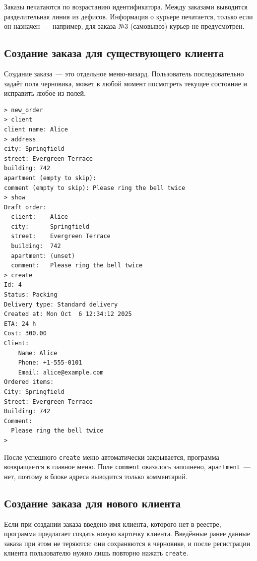 \documentclass[12pt]{extarticle}
\renewcommand{\baselinestretch}{1.5}
\newcommand{\cmd}[1]{\texttt{#1}}
\begin{document}
Заказы печатаются по возрастанию идентификатора. Между
заказами выводится разделительная линия из дефисов. Информация о
курьере печатается, только если он назначен~--- например, для
заказа №3 (самовывоз) курьер не предусмотрен.

\subsection{Создание заказа для существующего клиента}

Создание заказа~--- это отдельное меню-визард. Пользователь
последовательно задаёт поля черновика, может в любой момент
посмотреть текущее состояние и исправить любое из полей.

\renewcommand{\baselinestretch}{1}
\begin{lstlisting}
> new_order
> client
client name: Alice
> address
city: Springfield
street: Evergreen Terrace
building: 742
apartment (empty to skip):
comment (empty to skip): Please ring the bell twice
> show
Draft order:
  client:    Alice
  city:      Springfield
  street:    Evergreen Terrace
  building:  742
  apartment: (unset)
  comment:   Please ring the bell twice
> create
Id: 4
Status: Packing
Delivery type: Standard delivery
Created at: Mon Oct  6 12:34:12 2025
ETA: 24 h
Cost: 300.00
Client:
    Name: Alice
    Phone: +1-555-0101
    Email: alice@example.com
Ordered items:
City: Springfield
Street: Evergreen Terrace
Building: 742
Comment:
  Please ring the bell twice
>
\end{lstlisting}
\renewcommand{\baselinestretch}{1.5}

После успешного \cmd{create} меню автоматически закрывается,
программа возвращается в главное меню. Поле \cmd{comment}
оказалось заполнено, \cmd{apartment}~--- нет, поэтому в блоке адреса
выводится только комментарий.

\subsection{Создание заказа для нового клиента}

Если при создании заказа введено имя клиента, которого нет в
реестре, программа предлагает создать новую карточку клиента.
Введённые ранее данные заказа при этом не теряются: они сохраняются
в черновике, и после регистрации клиента пользователю нужно лишь
повторно нажать \cmd{create}.
\end{document}
